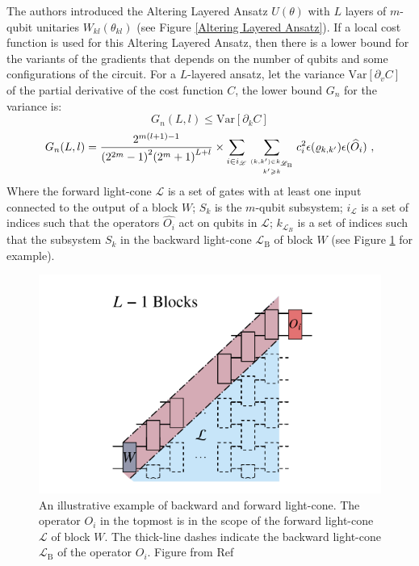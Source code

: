 The authors introduced the Altering Layered Ansatz $U(\theta)$ with $L$ layers of $m$-qubit unitaries $W_{kl}(\theta_{kl})$ (see Figure \ref{Altering Layered Ansatz}).
If a local cost function is used for this Altering Layered Ansatz, then there is a lower bound for the variants of the gradients that depends on the number of qubits and some configurations of the circuit. 
For a $L$-layered ansatz, let the variance $\mathrm{Var}[\partial_v C]$ of the partial derivative of the cost function $C$, the lower bound $G_n$ for the variance is:
\begin{equation}
    G_n(L,l) \leq \mathrm{Var}[\partial_k C]
\end{equation}
\begin{equation}
    G_n(L,l) = \frac{{2}^{m(l+1)-1}}{{({2}^{2m}-1)}^{2}{({2}^{m}+1)}^{L+l}}
    \times \mathop{\sum}\limits_{i\in {i}_{{\mathcal{L}}}}\mathop{\sum}\limits _{{(k,k^{\prime} )\in {k}_{{{\mathcal{L}}}_{\text{B}}}}\atop {k^{\prime} \geqslant k}}{c}_{i}^{2}\epsilon ({\rho }_{k,k^{\prime} })\epsilon ({\widehat{O}}_{i})\ ,
\end{equation}
Where the forward light-cone $\mathcal{L}$ is a set of gates with at least one input connected to the output of a block $W$; 
$S_k$ is the $m$-qubit subsystem;
$i_{\mathcal{L}}$ is a set of indices such that the operators $\hat{O_i}$ act on qubits in $\mathcal{L}$;
$k_{\mathcal{L}_B}$ is a set of indices such that the subsystem $S_k$ in the backward light-cone $\mathcal{L}_\text{B}$ of block $W$ (see Figure \ref{Forward-backward light cone} for example).
\begin{figure}
    \centering
    \includegraphics[scale=0.5]{LiteratureReview/Appendices/lightcone.png}
    \caption{
        An illustrative example of backward and forward light-cone.
        The operator $O_i$ in the topmost is in the scope of the forward light-cone $\mathcal{L}$ of block $W$.
        The thick-line dashes indicate the backward light-cone $\mathcal{L}_{\text{B}}$ of the operator $O_i$.
        Figure from Ref \cite{cerezoCostFunctionDependent2021}
    }
    \label{Forward-backward light cone}
\end{figure}


